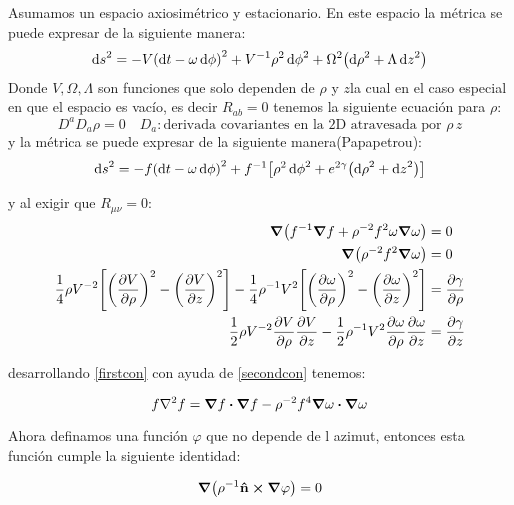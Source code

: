 \documentclass[../Main.tex]{subfiles}
\begin{document}
Asumamos un espacio axiosimétrico y estacionario. En este espacio la métrica se puede expresar de la siguiente manera:
%
\begin{equation}
\dd{s}^{2} = -V\qty(\dd{t}-\omega\dd{\phi})^{2}+V^{-1}\rho^{2}\dd{\phi}^{2}+\Omega^{2}\qty(\dd{\rho}^{2}+\Lambda\dd{z}^{2})
\end{equation}
%
Donde $V,\Omega, \Lambda$ son funciones que solo dependen de $\rho$ y $z$la cual en el caso especial en que el espacio es vacío, es decir $R_{ab}=0$ tenemos la siguiente ecuación para $\rho$:
%
\begin{equation}
    D^{a}D_{a}\rho=0 \quad D_{a}: \text{derivada covariantes en la 2D atravesada por } \rho \, z
\end{equation}
%
y la métrica se puede expresar de la siguiente manera(Papapetrou):
%
\begin{equation}
    \dd{s}^{2} = -f\qty(\dd{t}-\omega\dd{\phi})^{2}+f^{-1}\qty[\rho^{2}\dd{\phi}^{2}+e^{2\gamma}\qty(\dd{\rho}^{2}+\dd{z}^{2})]
\end{equation}

y al exigir que $R_{\mu\nu}=0$:
\begin{eqnarray}
    \label{firstcon}
    \grad{\qty(f^{-1}\grad{f}+\rho^{-2}f^{2}\omega\grad{\omega})} & =0 \\
    \label{secondcon}
    \grad{\qty(\rho^{-2}f^{2}\grad{\omega})} & =0 \\
    \label{thirdcon}
    \dfrac{1}{4}\rho V^{-2}\qty[\qty(\pdv{V}{\rho})^{2}-\qty(\pdv{V}{z})^{2}]-\dfrac{1}{4}\rho^{-1}V^{2}\qty[\qty(\pdv{\omega}{\rho})^{2}-\qty(\pdv{\omega}{z})^{2}] & =\pdv{\gamma}{\rho} \\
    \dfrac{1}{2}\rho V^{-2}\pdv{V}{\rho}\pdv{V}{z}-\dfrac{1}{2}\rho^{-1} V^{2}\pdv{\omega}{\rho}\pdv{\omega}{z} & = \pdv{\gamma}{z}
    \label{fourthcon}
\end{eqnarray}

desarrollando \eqref{firstcon} con ayuda de \eqref{secondcon} tenemos:

\begin{equation}
    f\laplacian{f}=\grad{f}\vdot\grad{f}-\rho^{-2}f^{4}\grad{\omega}\vdot\grad{\omega}
    \label{conduno}
\end{equation}

Ahora definamos una función $\varphi$ que no depende de l azimut, entonces esta función cumple la siguiente identidad:

\begin{equation}
    \grad(\rho^{-1}\vu{n}\cp\grad{\varphi})=0
\end{equation}
\end{document}
